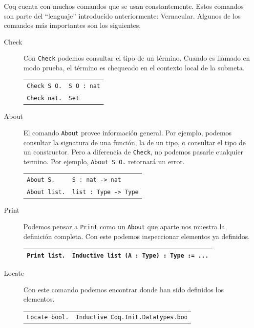 Coq cuenta con muchos comandos que se usan constantemente. Estos comandos son parte del ``lenguaje'' introducido anteriormente: Vernacular. Algunos de los comandos más importantes son los siguientes.

\begin{description}
  \item[Check] Con \texttt{Check} podemos consultar el tipo de un término. Cuando es llamado en modo prueba, el término es chequeado en el contexto local de la submeta.
  \begin{center}
  \begin{tabular}{| l | l |}
  \hline
  \texttt{Check S O.} & \texttt{S O : nat} \\
  \texttt{Check nat.} & \texttt{Set} \\
  \hline
  \end{tabular}
  \end{center}
  \item[About] El comando \texttt{About} provee información general. Por ejemplo, podemos consultar la signatura de una función, la de un tipo, o consultar el tipo de un constructor. Pero a diferencia de \texttt{Check}, no podemos pasarle cualquier termino. Por ejemplo, \texttt{About S O.} retornará un error.
  \begin{center}
  \begin{tabular}{| l | l |}
  \hline
  \texttt{About S.} & \texttt{S : nat -> nat} \\
  \texttt{About list.} & \texttt{list : Type -> Type} \\
  \hline
  \end{tabular}
  \end{center}
  \item[Print] Podemos pensar a \texttt{Print} como un \texttt{About} que aparte nos muestra la definición completa. Con este podemos inspeccionar elementos ya definidos.
  \begin{center}
  \begin{tabular}{| l | l |}
  \hline
  \texttt{Print list.} & \texttt{Inductive list (A : Type) : Type := ...} \\
  \hline
  \end{tabular}
  \end{center}
  \item[Locate] Con este comando podemos encontrar donde han sido definidos los elementos. 
  \begin{center}
  \begin{tabular}{| l | l |}
  \hline
  \texttt{Locate bool.} & \texttt{Inductive Coq.Init.Datatypes.boo} \\

\end{tabular}
\end{center}
\end{description}
